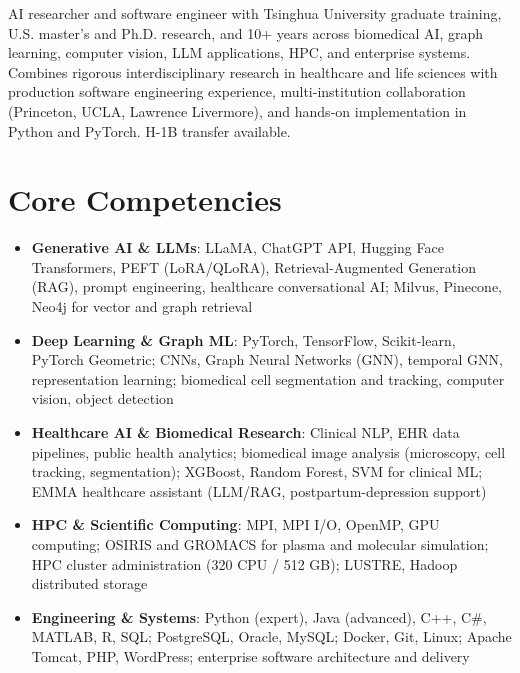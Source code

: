\documentclass[11pt,a4paper,sans]{moderncv}
\begin{document}
\makecvtitle


\vspace{6pt}
\small{AI researcher and software engineer with Tsinghua University graduate training, U.S. master's and Ph.D. research, and 10+ years across biomedical AI, graph learning, computer vision, LLM applications, HPC, and enterprise systems. Combines rigorous interdisciplinary research in healthcare and life sciences with production software engineering experience, multi-institution collaboration (Princeton, UCLA, Lawrence Livermore), and hands-on implementation in Python and PyTorch. H-1B transfer available.}


\section{Core Competencies}
\vspace{1pt}
\begin{itemize}

\item \textbf{Generative AI \& LLMs}: LLaMA, ChatGPT API, Hugging Face Transformers, PEFT (LoRA/QLoRA), Retrieval-Augmented Generation (RAG), prompt engineering, healthcare conversational AI; Milvus, Pinecone, Neo4j for vector and graph retrieval

\item \textbf{Deep Learning \& Graph ML}: PyTorch, TensorFlow, Scikit-learn, PyTorch Geometric; CNNs, Graph Neural Networks (GNN), temporal GNN, representation learning; biomedical cell segmentation and tracking, computer vision, object detection

\item \textbf{Healthcare AI \& Biomedical Research}: Clinical NLP, EHR data pipelines, public health analytics; biomedical image analysis (microscopy, cell tracking, segmentation); XGBoost, Random Forest, SVM for clinical ML; EMMA healthcare assistant (LLM/RAG, postpartum-depression support)

\item \textbf{HPC \& Scientific Computing}: MPI, MPI I/O, OpenMP, GPU computing; OSIRIS and GROMACS for plasma and molecular simulation; HPC cluster administration (320 CPU / 512 GB); LUSTRE, Hadoop distributed storage

\item \textbf{Engineering \& Systems}: Python (expert), Java (advanced), C++, C\#, MATLAB, R, SQL; PostgreSQL, Oracle, MySQL; Docker, Git, Linux; Apache Tomcat, PHP, WordPress; enterprise software architecture and delivery

\end{itemize}
\end{document}
